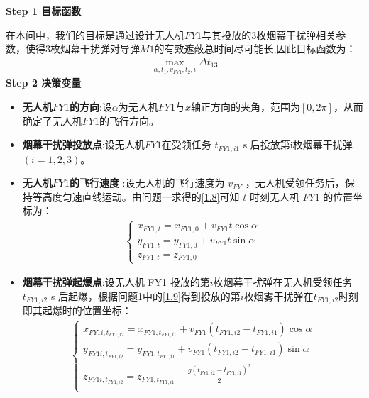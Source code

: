 \documentclass[../main.tex]{subfiles}
\begin{document}
\noindent \textbf{Step 1 目标函数}
\par 在本问中，我们的目标是通过设计无人机$FY1$与其投放的3枚烟幕干扰弹相关参数，使得3枚烟幕干扰弹对导弹$M1$的有效遮蔽总时间尽可能长,因此目标函数为：
\begin{align}\label{12.1}
  \underset{\alpha ,t_1,v_{FY1},t_2,i}{\max}\Delta t_{13}
\end{align}
\noindent \textbf{Step 2 决策变量}

\begin{itemize}
\item \textbf{无人机$FY1$的方向}:设$\alpha $为无人机$FY1$与$x$轴正方向的夹角，范围为$\left[ 0,2\pi \right] $，从而确定了无人机$FY1$的飞行方向。
\item \textbf{烟幕干扰弹投放点}:设无人机$FY1$在受领任务 \( t_{FY1,i1} \) s 后投放第i枚烟幕干扰弹$(i=1,2,3)$。
\item  \textbf{无人机$FY1$的飞行速度} :设无人机的飞行速度为 \( v_{FY1} \)，无人机受领任务后，保持等高度匀速直线运动。由问题一求得的\eqref{1.8}可知 \( t \) 时刻无人机 \( FY1 \) 的位置坐标为：
\begin{align}\label{12.3}
  \begin{cases}
x_{FY1,t} = x_{FY1,0} + v_{FY1} t \cos\alpha \\
y_{FY1,t} = y_{FY1,0} + v_{FY1} t \sin\alpha \\
z_{FY1,t} = z_{FY1,0}
\end{cases}
\end{align}
\item \textbf{烟幕干扰弹起爆点}:设无人机 FY1 投放的第$i$枚烟幕干扰弹在无人机受领任务 \( t_{FY1,i2} \) s 后起爆，根据问题1中的\eqref{1.9}得到投放的第$i$枚烟雾干扰弹在$t_{FY1,i2}$时刻即其起爆时的位置坐标：
\begin{align}\label{12.4}
\left\{ \begin{array}{l}
	x_{FY1i,t_{FY1,i2}}=x_{FY1,t_{FY1,i1}}+v_{FY1}\left( t_{FY1,i2}-t_{FY1,i1} \right) \cos \alpha\\
	y_{FY1i,t_{FY1,i2}}=y_{FY1,t_{FY1,i1}}+v_{FY1}\left( t_{FY1,i2}-t_{FY1,i1} \right) \sin \alpha\\
	z_{FY1i,t_{FY1,i2}}=z_{FY1,t_{FY1,i1}}-\frac{g\left( t_{FY1,i2}-t_{FY1,i1} \right) ^2}{2}\\
\end{array} \right. 
\end{align}


\end{itemize}
\end{document}
